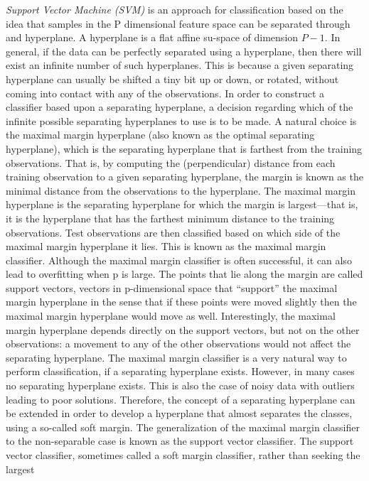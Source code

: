 \textit{Support Vector Machine (SVM)} is an approach for classification based on the idea that samples in the P dimensional feature space can be
separated through and hyperplane. A hyperplane is a flat affine su-space of dimension $P-1$.
In general, if the data can be perfectly separated using a hyperplane, then there will exist an 
infinite number of such hyperplanes. This is because a given separating hyperplane can usually be 
shifted a tiny bit up or down, or rotated, without coming into contact with any of the observations. In 
order to construct a classifier based upon a separating hyperplane, a decision regarding which of the infinite possible separating 
hyperplanes to use is to be made. 
A natural choice is the maximal margin hyperplane (also known as the optimal separating 
hyperplane), which is the separating hyperplane that is farthest from the training observations. That 
is, by computing the (perpendicular) distance from each training observation to a given separating 
hyperplane, the margin is known as the minimal distance from the observations to the hyperplane.
The maximal margin hyperplane is the separating hyperplane for which the margin is largest—that is, 
it is the hyperplane that has the farthest minimum distance 
to the training observations. 
Test observations are then classified based on which side of the 
maximal margin hyperplane it lies. This is known as the maximal margin classifier.
Although the maximal margin classifier is often successful, it can also lead to overfitting when p is 
large.
The points that lie along the margin are called support vectors, vectors in p-dimensional space that
“support” the maximal margin hyperplane in the sense that if these points were moved slightly then 
the maximal margin hyperplane would move as well. Interestingly, the maximal margin hyperplane depends directly on the 
support vectors, but not on the other observations: a movement to any of the 
other observations would not affect the separating hyperplane.
The maximal margin classifier is a very natural way to perform classification, if a separating 
hyperplane exists. However, in many cases no separating hyperplane exists. This 
is also the case of noisy data with outliers leading to poor solutions.
Therefore, the concept of a separating hyperplane can be extended in order to develop a hyperplane that 
almost separates the classes, using a so-called soft margin. The generalization of the maximal margin 
classifier to the non-separable case is known as the support vector classifier.
The support vector classifier, sometimes called a soft margin classifier, rather than seeking the largest 
